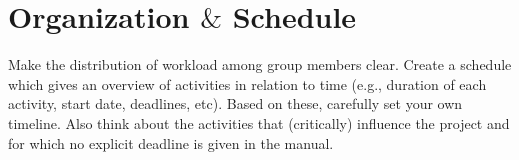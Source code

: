 \chapter{Organization $\&$ Schedule  } Make the distribution of workload among group members clear. Create a schedule which gives an overview of activities in relation to time (e.g., duration of each activity, start date, deadlines, etc). Based on these, carefully set your own timeline. Also think about the activities that (critically) influence the project and for which no explicit deadline is given in the manual.

